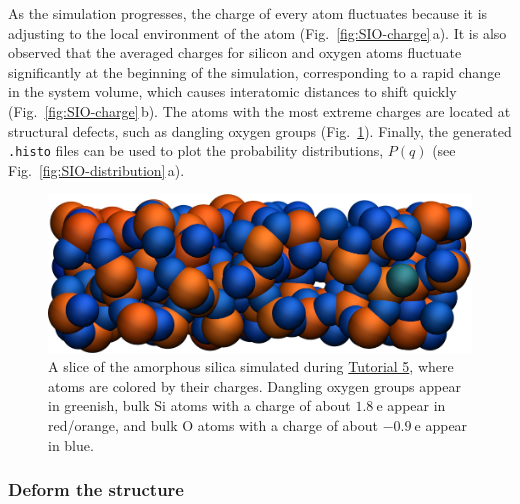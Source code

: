 \documentclass[9pt,tutorial]{livecoms}
\newcommand{\flecmd}[1]{\textcolor{command}{\texttt{#1}}} %
\begin{document}
As the simulation progresses, the charge of every atom fluctuates
because it is adjusting to the local environment of the atom (Fig.~\ref{fig:SIO-charge}\,a).
It is also observed that the averaged charges for silicon and oxygen
atoms fluctuate significantly at the beginning of the simulation, corresponding
to a rapid change in the system volume, which causes interatomic distances to
shift quickly (Fig.~\ref{fig:SIO-charge}\,b).  The atoms with the
most extreme charges are located at structural defects,
such as dangling oxygen groups (Fig.~\ref{fig:SIO-slice}).
Finally, the generated \flecmd{.histo} files can be used to
plot the probability distributions, $P(q)$ (see Fig.~\ref{fig:SIO-distribution}\,a).

\begin{figure}
\includegraphics[width=\linewidth]{SIO-slice}
\caption{A slice of the amorphous silica simulated during
\hyperref[reactive-silicon-dioxide-label]{Tutorial 5}, where atoms are colored by their charges.
Dangling oxygen groups appear in greenish, bulk Si atoms with a charge of about
$1.8~\text{e}$  appear in red/orange, and bulk O atoms with a charge of about
$-0.9~\text{e}$ appear in blue.}
\label{fig:SIO-slice}
\end{figure}

\subsubsection{Deform the structure}
\end{document}
